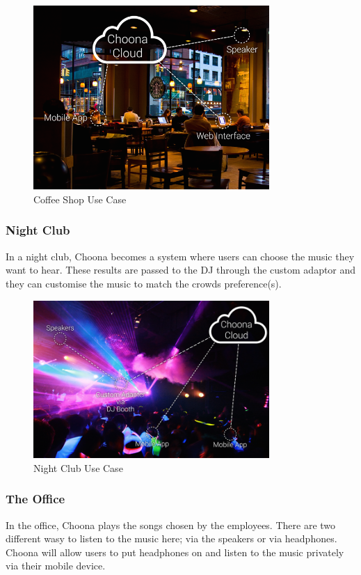     \begin{figure}[h!]
      \centering
      \includegraphics[width=0.8\textwidth]{./img/coffee-shop.png}
      \caption{Coffee Shop Use Case}
      \label{fig:coffee_shop}
    \end{figure}

\subsubsection{Night Club} 
In a night club, Choona becomes a system where users can choose the music they want to hear.  These results are passed to the DJ through the custom adaptor and they can customise the music to match the crowds preference(s).  \\

    \begin{figure}[h!]
      \centering
      \includegraphics[width=0.8\textwidth]{./img/nightclub.png}
      \caption{Night Club Use Case}
      \label{fig:night_club}
    \end{figure}

\subsubsection{The Office} 
In the office, Choona plays the songs chosen by the employees.  There are two different wasy to listen to the music here; via the speakers or via headphones.  Choona will allow users to put headphones on and listen to the music privately via their mobile device. \\

